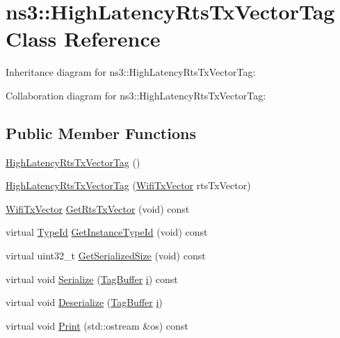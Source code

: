 \hypertarget{classns3_1_1HighLatencyRtsTxVectorTag}{}\section{ns3\+:\+:High\+Latency\+Rts\+Tx\+Vector\+Tag Class Reference}
\label{classns3_1_1HighLatencyRtsTxVectorTag}


Inheritance diagram for ns3\+:\+:High\+Latency\+Rts\+Tx\+Vector\+Tag\+:


Collaboration diagram for ns3\+:\+:High\+Latency\+Rts\+Tx\+Vector\+Tag\+:
\subsection*{Public Member Functions}
\begin{DoxyCompactItemize}
\item 
\hyperlink{classns3_1_1HighLatencyRtsTxVectorTag_ab8c985526d13d5f7fbb9965930a082e7}{High\+Latency\+Rts\+Tx\+Vector\+Tag} ()
\item 
\hyperlink{classns3_1_1HighLatencyRtsTxVectorTag_ac4b9c7e7f11790c9d4a110c379ffe54b}{High\+Latency\+Rts\+Tx\+Vector\+Tag} (\hyperlink{classns3_1_1WifiTxVector}{Wifi\+Tx\+Vector} rts\+Tx\+Vector)
\item 
\hyperlink{classns3_1_1WifiTxVector}{Wifi\+Tx\+Vector} \hyperlink{classns3_1_1HighLatencyRtsTxVectorTag_a2c76eda29a5ddf35315fa14df5e1c8aa}{Get\+Rts\+Tx\+Vector} (void) const 
\item 
virtual \hyperlink{classns3_1_1TypeId}{Type\+Id} \hyperlink{classns3_1_1HighLatencyRtsTxVectorTag_a6d9be136d81f12807376636440743ffb}{Get\+Instance\+Type\+Id} (void) const 
\item 
virtual uint32\+\_\+t \hyperlink{classns3_1_1HighLatencyRtsTxVectorTag_a5818c676dc4a8d9de2ce4813b992a5db}{Get\+Serialized\+Size} (void) const 
\item 
virtual void \hyperlink{classns3_1_1HighLatencyRtsTxVectorTag_af2443ead70fe64f66735388998090942}{Serialize} (\hyperlink{classns3_1_1TagBuffer}{Tag\+Buffer} \hyperlink{lte__uplink__power__control_8m_a6f6ccfcf58b31cb6412107d9d5281426}{i}) const 
\item 
virtual void \hyperlink{classns3_1_1HighLatencyRtsTxVectorTag_a90589fca46c96ce6c1ddd9b43b2cbea3}{Deserialize} (\hyperlink{classns3_1_1TagBuffer}{Tag\+Buffer} \hyperlink{lte__uplink__power__control_8m_a6f6ccfcf58b31cb6412107d9d5281426}{i})
\item 
virtual void \hyperlink{classns3_1_1HighLatencyRtsTxVectorTag_a0fb0ef5e88b9ccc6c4bc011b689a1730}{Print} (std\+::ostream \&os) const 
\end{DoxyCompactItemize}
